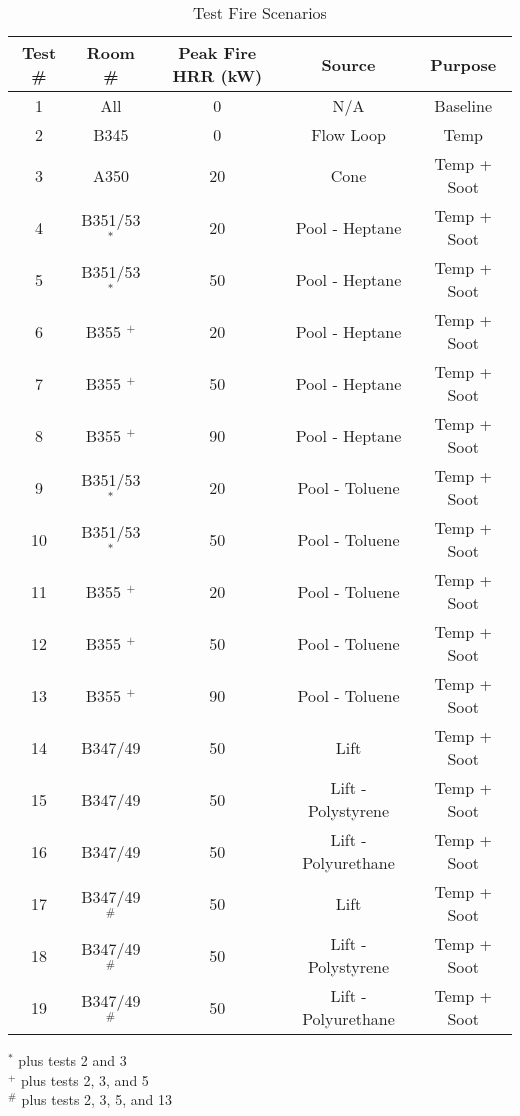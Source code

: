 \documentclass[12pt,oneside]{book}
\begin{document}
\begin{table}[!h]
\centering
\caption{Test Fire Scenarios}
\label{tab:fires}
\begin{tabular}{ccccc}
\toprule[1.5pt]
Test \# & Room \# & Peak Fire HRR (kW) & Source & Purpose \\
\midrule
1  &  All             & 0    & N/A                 & Baseline      \\
2  &  B345            & 0    & Flow Loop           & Temp          \\
3  &  A350            & 20   & Cone                & Temp + Soot   \\
4  &  B351/53 $^*$    & 20   & Pool - Heptane      & Temp + Soot   \\
5  &  B351/53 $^*$    & 50   & Pool - Heptane      & Temp + Soot   \\
6  &  B355 $^+$       & 20   & Pool - Heptane      & Temp + Soot   \\
7  &  B355 $^+$       & 50   & Pool - Heptane      & Temp + Soot   \\
8  &  B355 $^+$       & 90   & Pool - Heptane      & Temp + Soot   \\
9  &  B351/53 $^*$    & 20   & Pool - Toluene      & Temp + Soot   \\
10 &  B351/53 $^*$    & 50   & Pool - Toluene      & Temp + Soot   \\
11 &  B355 $^+$       & 20   & Pool - Toluene      & Temp + Soot   \\
12 &  B355 $^+$       & 50   & Pool - Toluene      & Temp + Soot   \\
13 &  B355 $^+$       & 90   & Pool - Toluene      & Temp + Soot   \\
14 &  B347/49         & 50   & Lift                & Temp + Soot   \\
15 &  B347/49         & 50   & Lift - Polystyrene  & Temp + Soot   \\
16 &  B347/49         & 50   & Lift - Polyurethane & Temp + Soot   \\
17 &  B347/49$^\#$    & 50   & Lift                & Temp + Soot   \\
18 &  B347/49$^\#$    & 50   & Lift - Polystyrene  & Temp + Soot   \\
19 &  B347/49$^\#$    & 50   & Lift - Polyurethane & Temp + Soot   \\
\bottomrule[1.25pt]
\end{tabular}\par
\raggedright
$^*$ plus tests 2 and 3 \\
$^+$ plus tests 2, 3, and 5 \\
$^\#$ plus tests 2, 3, 5, and 13 \\
\end{table}
\justify
\end{document}
